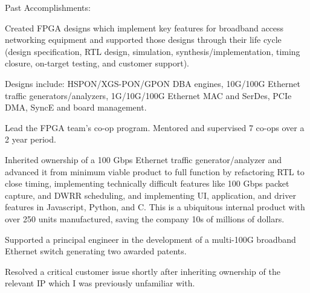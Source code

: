 \documentclass[8pt]{deedy-resume-reversed}
\begin{document}
\begin{minipage}[t]{1.0\textwidth}
Past Accomplishments:
\vspace{\topsep} %
\begin{tightemize}
\item Created FPGA designs which implement key features for broadband access networking equipment and
supported those designs through their life cycle (design specification, RTL design, simulation,
synthesis/implementation, timing closure, on-target testing, and customer support).
\item Designs include: HSPON/XGS-PON/GPON DBA engines, 10G/100G Ethernet traffic generators/analyzers,
1G/10G/100G Ethernet MAC and SerDes, PCIe DMA, SyncE and board management.
\item Lead the FPGA team's co-op program. Mentored and supervised 7 co-ops over a 2 year period.
\item Inherited ownership of a 100 Gbps Ethernet traffic generator/analyzer and advanced it from minimum viable product to full function by refactoring RTL to close timing,
implementing technically difficult features like 100 Gbps packet capture, and DWRR scheduling, and implementing UI, application,
and driver features in Javascript, Python, and C. This is a ubiquitous internal product with over 250 units manufactured, saving the company 10s of millions of dollars.
\item Supported a principal engineer in the development of a multi-100G broadband Ethernet switch generating two awarded patents.
\item Resolved a critical customer issue shortly after inheriting ownership of the relevant IP which I was previously unfamiliar with.

\end{tightemize}
\end{minipage}
\end{document}
